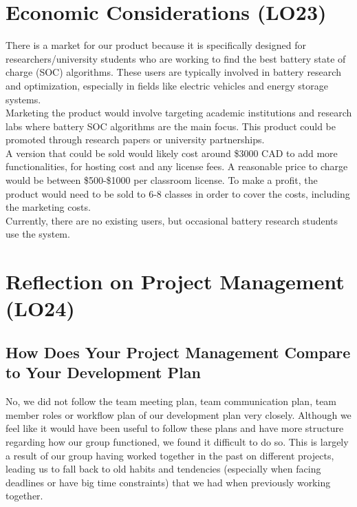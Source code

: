 \documentclass{article}
\begin{document}
\section{Economic Considerations (LO23)}

There is a market for our product because it is specifically designed for researchers/university students who are working to find the best battery state of charge (SOC) algorithms. These users are typically involved in battery research and optimization, especially in fields like electric vehicles and energy storage systems. \\

Marketing the product would involve targeting academic institutions and research labs where battery SOC algorithms are the main focus. This product could be promoted through research papers or university partnerships. \\

A version that could be sold would likely cost around \$3000 CAD to add more functionalities, for hosting cost and any license fees. A reasonable price to charge would be between \$500-\$1000 per classroom license. To make a profit, the product would need to be sold to 6-8 classes in order to cover the costs, including the marketing costs.\\

Currently, there are no existing users, but occasional battery research students use the system.

\section{Reflection on Project Management (LO24)}

\subsection{How Does Your Project Management Compare to Your Development Plan}

No, we did not follow the team meeting plan, team communication plan, team member roles or workflow plan of our development plan very closely. Although we feel like it would have been useful to follow these plans and have more structure regarding how our group functioned, we found it difficult to do so. This is largely a result of our group having worked together in the past on different projects, leading us to fall back to old habits and tendencies (especially when facing deadlines or have big time constraints) that we had when previously working together. \\
\end{document}
